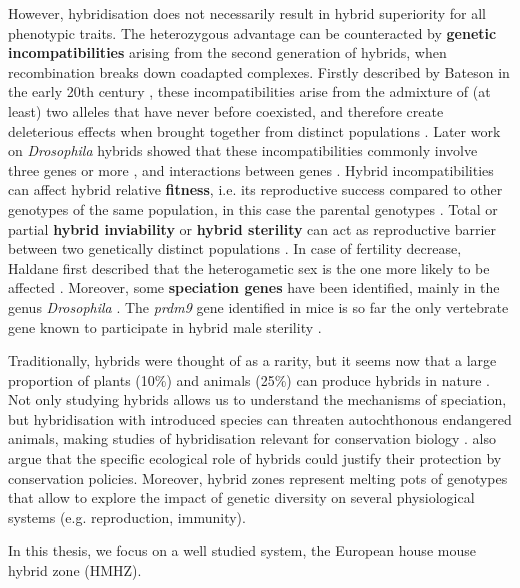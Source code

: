 However, hybridisation does not necessarily result in hybrid superiority for all phenotypic traits. The heterozygous advantage can be counteracted by \textbf{genetic incompatibilities} arising from the second generation of hybrids, when recombination breaks down coadapted complexes. Firstly described by Bateson in the early 20th century \citep{bateson_heredity_1909}, these incompatibilities arise from the admixture of (at least) two alleles that have never before coexisted, and therefore create deleterious effects when brought together from distinct populations \citep{dobzhansky_studies_1936, muller_isolating_1942, orr_population_1995}. Later work on \textit{Drosophila} hybrids showed that these incompatibilities commonly involve three genes or more \citep{cabot_genetics_1994, palopoli_genetics_1994}, and interactions between genes \parencite[\textbf{negative epistasis};][]{larson_evolution_2018}. Hybrid incompatibilities can affect hybrid relative \textbf{fitness}, i.e. its reproductive success compared to other genotypes of the same population, in this case the parental genotypes \citep{krimbas_fitness_2001}. Total or partial \textbf{hybrid inviability} or \textbf{hybrid sterility} can act as reproductive barrier between two genetically distinct populations \citep{coyne_reproductive_2001}. In case of fertility decrease, Haldane first described that the heterogametic sex is the one more likely to be affected \citep{haldane_sex_1922}. Moreover, some \textbf{speciation genes} \parencite[genes underlying reproductive isolation;][]{wu_genes_2004} have been identified, mainly in the genus \textit{Drosophila} \citep{oliver_accelerated_2009}. The \textit{prdm9} gene identified in mice is so far the only vertebrate gene known to participate in hybrid male sterility \citep{mihola_mouse_2009}. 
\par
Traditionally, hybrids were thought of as a rarity, but it seems now that a large proportion of plants (10\%) and animals (25\%) can produce hybrids in nature \citep{mallet_hybridization_2005}. Not only studying hybrids allows us to understand the mechanisms of speciation, but hybridisation with introduced species can threaten autochthonous endangered animals, making studies of hybridisation relevant for conservation biology \citep{simberloff_hybridization_1996}. \cite{stronen_perspectives_2013} also argue that the specific ecological role of hybrids could justify their protection by conservation policies. Moreover, hybrid zones represent melting pots of genotypes that allow to explore the impact of genetic diversity on several physiological systems (e.g. reproduction, immunity).
\par
In this thesis, we focus on a well studied system, the European house mouse hybrid zone (HMHZ).

